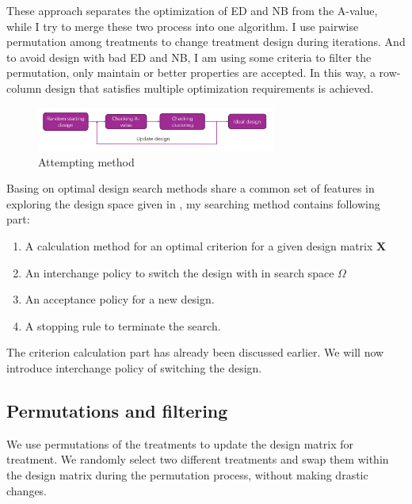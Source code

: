\documentclass[
  a4paper,
  oneside,
  openany,
  12pt,
  onecolumn]{book}
\theoremstyle{definition}
\theoremstyle{plain}
\theoremstyle{remark}
\begin{document}
These approach separates the optimization of ED and NB from the A-value,
while I try to merge these two process into one algorithm. I use
pairwise permutation among treatments to change treatment design during
iterations. And to avoid design with bad ED and NB, I am using some
criteria to filter the permutation, only maintain or better properties
are accepted. In this way, a row-column design that satisfies multiple
optimization requirements is achieved.

\begin{figure}[H]

{\centering \includegraphics[width=0.7\textwidth,height=\textheight]{images/methods/method2.png}

}

\caption{Attempting method}

\end{figure}%

Basing on optimal design search methods share a common set of features
in exploring the design space given in \citet{butler2013optimal}, my
searching method contains following part:

\begin{enumerate}
\def\labelenumi{\arabic{enumi}.}
\item
  A calculation method for an optimal criterion for a given design
  matrix \(\boldsymbol{X}\)
\item
  An interchange policy to switch the design with in search space
  \(\Omega\)
\item
  An acceptance policy for a new design.
\item
  A stopping rule to terminate the search.
\end{enumerate}

The criterion calculation part has already been discussed earlier. We
will now introduce interchange policy of switching the design.

\subsection{Permutations and
filtering}\label{permutations-and-filtering}

We use permutations of the treatments to update the design matrix for
treatment. We randomly select two different treatments and swap them
within the design matrix during the permutation process, without making
drastic changes.
\end{document}
